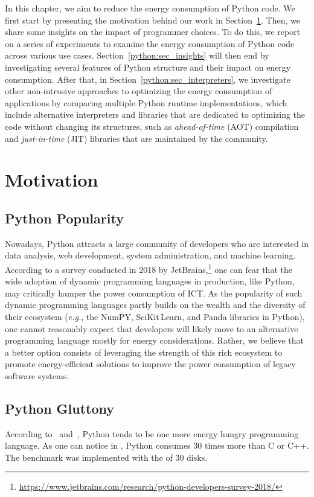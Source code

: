 In this chapter, we aim to reduce the energy consumption of Python code.
We first start by presenting the motivation behind our work in Section~\ref{python:sec_motivation}.
Then, we share some insights on the impact of programmer choices.
To do this, we report on a series of experiments to examine the energy consumption of Python code across various use cases.
Section~\ref{python:sec_insights} will then end by investigating several features of Python structure and their impact on energy consumption.
After that, in Section~\ref{python:sec_interpreters}, we investigate other non-intrusive approaches to optimizing the energy consumption of applications by comparing multiple Python runtime implementations, which include alternative interpreters and libraries that are dedicated to optimizing the code without changing its structures, such as \emph{ahead-of-time} (AOT) compilation and \emph{just-in-time} (JIT) libraries that are maintained by the community.


\section{Motivation}\label{python:sec_motivation}

\subsection{Python Popularity}
Nowadays, Python attracts a large community of developers who are interested in data analysis, web development, system administration, and machine learning.
According to a survey conducted in 2018 by JetBrains,\footnote{\url{https://www.jetbrains.com/research/python-developers-survey-2018/}} one can fear that the wide adoption of dynamic programming languages in production, like Python, may critically hamper the power consumption of ICT.
As the popularity of such dynamic programming languages partly builds on the wealth and the diversity of their ecosystem (\emph{e.g.}, the NumPY, SciKit\,Learn, and Panda libraries in Python), one cannot reasonably expect that developers will likely move to an alternative programming language mostly for energy considerations.
Rather, we believe that a better option consists of leveraging the strength of this rich ecosystem to promote energy-efficient solutions to improve the power consumption of legacy software systems.

\subsection{Python Gluttony}
According to~\cite{pinto_energy_2017} and~\cite{noureddine_preliminary_2012}, Python tends to be one more energy hungry programming language.
As one can notice in , Python consumes $30$ times more than C or C++.
The benchmark was implemented with the  of 30 disks.


